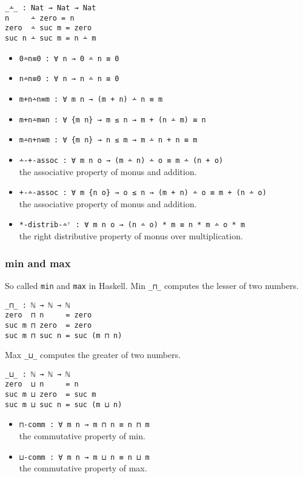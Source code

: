 \documentclass[../thesis.tex]{subfiles}
\begin{document}
\begin{lstlisting}
_∸_ : Nat → Nat → Nat
n     ∸ zero = n
zero  ∸ suc m = zero
suc n ∸ suc m = n ∸ m
\end{lstlisting}

\begin{itemize}
    \item {\lstinline|0∸n≡0 : ∀ n → 0 ∸ n ≡ 0|}
    \item {\lstinline|n∸n≡0 : ∀ n → n ∸ n ≡ 0|}
    \item {\lstinline|m+n∸n≡m : ∀ m n → (m + n) ∸ n ≡ m|}
    \item {\lstinline|m+n∸m≡n : ∀ {m n} → m ≤ n → m + (n ∸ m) ≡ n|}
    \item {\lstinline|m∸n+n≡m : ∀ {m n} → n ≤ m → m ∸ n + n ≡ m|}
    \item {\lstinline|∸-+-assoc : ∀ m n o → (m ∸ n) ∸ o ≡ m ∸ (n + o)|}
        \\ the associative property of monus and addition.
    \item {\lstinline|+-∸-assoc : ∀ m {n o} → o ≤ n → (m + n) ∸ o ≡ m + (n ∸ o)|}
        \\ the associative property of monus and addition.
    \item {\lstinline|*-distrib-∸ʳ : ∀ m n o → (n ∸ o) * m ≡ n * m ∸ o * m|}
        \\ the right distributive property of monus over multiplication.
\end{itemize}

\subsubsection{min and max}

So called {\lstinline|min|} and {\lstinline|max|} in Haskell.
Min {\lstinline|_⊓_|} computes the lesser of two numbers.

\begin{lstlisting}
_⊓_ : ℕ → ℕ → ℕ
zero  ⊓ n     = zero
suc m ⊓ zero  = zero
suc m ⊓ suc n = suc (m ⊓ n)
\end{lstlisting}

Max {\lstinline|_⊔_|} computes the greater of two numbers.

\begin{lstlisting}
_⊔_ : ℕ → ℕ → ℕ
zero  ⊔ n     = n
suc m ⊔ zero  = suc m
suc m ⊔ suc n = suc (m ⊔ n)
\end{lstlisting}

\begin{itemize}
    \item {\lstinline|⊓-comm : ∀ m n → m ⊓ n ≡ n ⊓ m|}
        \\ the commutative property of min.
    \item {\lstinline|⊔-comm : ∀ m n → m ⊔ n ≡ n ⊔ m|}
        \\ the commutative property of max.
\end{itemize}
\end{document}
